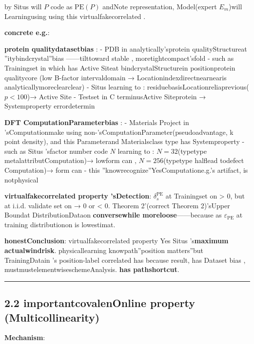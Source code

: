 \documentclass[
  12pt,
]{article}
\begin{document}
by  Situs will  \(P\) code as  \(\text{PE}(P)\) andNote representation, Model(expert 
\(E_m\))will Learningusing using this virtualfakecorrelated . 

\textbf{concrete e.g.}: 

\textbf{protein qualitydatasetbias }:  - PDB
in analytically'sprotein qualityStructureat ''itybindcrystal''bias ------tilttoward stable , moretightcompact'sfold  -
such as Trainingset in which has Active Siteat bindcrystalStructurein positionprotein qualitycore (low B-factor
intervaldomain → Locationindexdirectnearnearis analyticallymoreclearclear) - Situs
learning to : residuebasisLocationreliaprevious(\(p < 100\))→ Active Site - Testset in  C
terminusActive Siteprotein  → Systemproperty errordetermin

\textbf{DFT ComputationParameterbias }:  - Materials Project
in 'sComputationmake using non-'sComputationParameter(pseudoadvantage, k
point density), and this Parameterand Materialsclass type has Systemproperty  - such as  Situs 'sfactor number code 
\(N\) learning to : \(N=32\)(typetype metalattributComputation)→
lowform can , \(N=256\)(typetype halflead todefect Computation)→ form can  -
this ''knowrecognize''YesComputatione.g.'s artifact, is notphysical

\textbf{virtualfakecorrelated property 'sDetection}: \(\delta_s^{\text{PE}}\) at Trainingset on 
\textgreater{} 0, but at  i.i.d. validate set on  → 0 or  \textless{} 0. Theorem
2'(correct  Theorem 2)'sUpper Boundat DistributionDataon \textbf{conversewhile moreloose}------because as 
\(\varepsilon_{\text{PE}}\) at training distributionon is lowestimat. 

\textbf{honestConclusion}: virtualfakecorrelated property Yes Situs
's\textbf{maximum actualwindrisk}. physicallearning knowpath''position matters''but TrainingDatain 's
position-label
correlated has because result, has Dataset bias , mustmustelementwiseschemeAnalysis. \textbf{has pathshortcut}. 

\begin{center}\rule{0.5\linewidth}{0.5pt}\end{center}

\subsection{2.2
importantcovalenOnline property (Multicollinearity)}\label{ux591aux91cdux5171ux7ebfux6027multicollinearity}

\textbf{Mechanism}: 
\end{document}

